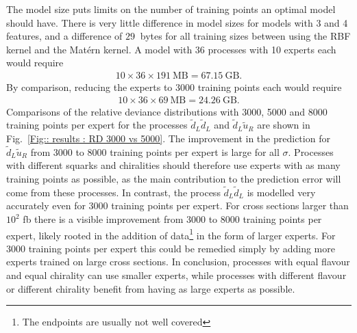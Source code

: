 \documentclass[twoside,english]{uiofysmaster}
\begin{document}
The model size puts limits on the number of training points an optimal model should have. There is very little difference in model sizes for models with 3 and 4 features, and a difference of $29~$ bytes for all training sizes between using the RBF kernel and the Mat\'{e}rn kernel. A model with 36 processes with 10 experts each would require
\begin{align}
10 \times 36 \times 191~\mathrm{MB} = 67.15~\mathrm{GB}. \nonumber
\end{align}
By comparison, reducing the experts to 3000 training points each would require
\begin{align}
10 \times 36 \times 69~\mathrm{MB} = 24.26~\mathrm{GB}. \nonumber
\end{align}
Comparisons of the relative deviance distributions with 3000, 5000 and 8000 training points per expert for the processes $\widetilde{d}_L \widetilde{d}_L$ and $\widetilde{d}_L \widetilde{u}_R$ are shown in Fig.~\ref{Fig:: results : RD 3000 vs 5000}. The improvement in the prediction for $\widetilde{d}_L \widetilde{u}_R$ from 3000 to 8000 training points per expert is large for all $\sigma$. Processes with different squarks and chiralities should therefore use experts with as many training points as possible, as the main contribution to the prediction error will come from these processes. In contrast, the process $\widetilde{d}_L \widetilde{d}_L$ is modelled very accurately even for 3000 training points per expert. For cross sections larger than $10^2$ fb there is a visible improvement from 3000 to 8000 training points per expert, likely rooted in the addition of data\footnote{The endpoints are usually not well covered} in the form of larger experts. For 3000 training points per expert this could be remedied simply by adding more experts trained on large cross sections. In conclusion, processes with equal flavour and equal chirality can use smaller experts, while processes with different flavour or different chirality benefit from having as large experts as possible.
\end{document}
